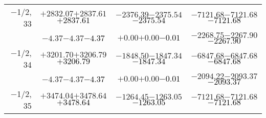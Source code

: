 \documentclass[compress]{beamer}
\begin{document}
\begin{frame}
{\begin{tabular}{r | c | c | c}
$-$1/2, 33 & $+2832.07$\hspace{0.1 cm}$+2837.61$\hspace{0.1 cm}\textcolor{black}{$+2837.61$} & $-2376.39$\hspace{0.1 cm}$-2375.54$\hspace{0.1 cm}\textcolor{black}{$-2375.54$} & $-7121.68$\hspace{0.1 cm}$-7121.68$\hspace{0.1 cm}\textcolor{black}{$-7121.68$} \\
           & $-4.37$\hspace{0.1 cm}$-4.37$\hspace{0.1 cm}\textcolor{black}{$-4.37$} & $+0.00$\hspace{0.1 cm}$+0.00$\hspace{0.1 cm}\textcolor{black}{$-0.01$} & $-2268.75$\hspace{0.1 cm}$-2267.90$\hspace{0.1 cm}\textcolor{black}{$-2267.90$} \\
$-$1/2, 34 & $+3201.70$\hspace{0.1 cm}$+3206.79$\hspace{0.1 cm}\textcolor{black}{$+3206.79$} & $-1848.50$\hspace{0.1 cm}$-1847.34$\hspace{0.1 cm}\textcolor{black}{$-1847.34$} & $-6847.68$\hspace{0.1 cm}$-6847.68$\hspace{0.1 cm}\textcolor{black}{$-6847.68$} \\
           & $-4.37$\hspace{0.1 cm}$-4.37$\hspace{0.1 cm}\textcolor{black}{$-4.37$} & $+0.00$\hspace{0.1 cm}$+0.00$\hspace{0.1 cm}\textcolor{black}{$-0.01$} & $-2094.22$\hspace{0.1 cm}$-2093.37$\hspace{0.1 cm}\textcolor{black}{$-2093.37$} \\
$-$1/2, 35 & $+3474.04$\hspace{0.1 cm}$+3478.64$\hspace{0.1 cm}\textcolor{black}{$+3478.64$} & $-1264.45$\hspace{0.1 cm}$-1263.05$\hspace{0.1 cm}\textcolor{black}{$-1263.05$} & $-7121.68$\hspace{0.1 cm}$-7121.68$\hspace{0.1 cm}\textcolor{black}{$-7121.68$} \\

\end{tabular}}
\end{frame}
\end{document}
